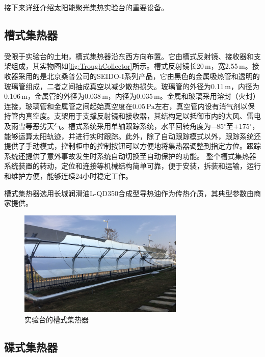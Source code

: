 接下来详细介绍太阳能聚光集热实验台的重要设备。

\subsection{槽式集热器}
受限于实验台的土地，槽式集热器沿东西方向布置。它由槽式反射镜、接收器和支架组成，其实物图如\autoref{fig:TroughCollector}所示。槽式反射镜长20$\,\mathrm{m}$，宽2.55$\,\mathrm{m}$。接收器采用的是北京桑普公司的SEIDO-I系列产品，它由黑色的金属吸热管和透明的玻璃管组成，二者之间抽成真空以减少散热损失。玻璃管的外径为0.11$\,\mathrm{m}$，内径为0.106$\,\mathrm{m}$，金属管的外径为0.038$\,\mathrm{m}$，内径为0.035$\,\mathrm{m}$。金属和玻璃采用溶封（火封）连接，玻璃管和金属管之间起始真空度在0.05$\,\mathrm{Pa}$左右，真空管内设有消气剂以保持管内真空度。支架用于支撑反射镜和接收器，其结构足以抵御市内的大风、雷电及雨雪等恶劣天气。槽式系统采用单轴跟踪系统，水平回转角度为$-$85$^\circ$至$+$175$^\circ$，能够运算太阳轨迹，并进行实时跟踪。此外，除了自动跟踪模式以外，跟踪系统还提供了手动模式，控制柜中的控制按钮可以方便地将集热器调整到指定方位。跟踪系统还提供了意外事故发生时系统自动切换至自动保护的功能。
整个槽式集热器系统装置的转动，定位和连接等机械结构简单可靠，便于安装，拆装和运输，运行和维护方便，能够连续24小时稳定工作。

槽式集热器选用长城润滑油L-QD350合成型导热油作为传热介质，其典型参数由商家提供。

\begin{figure}[!ht]
\centering
\includegraphics[width=0.7\textwidth]{fig/TroughCollector.jpg}
\caption{实验台的槽式集热器}
\label{fig:TroughCollector}
\end{figure}

\subsection{碟式集热器}

